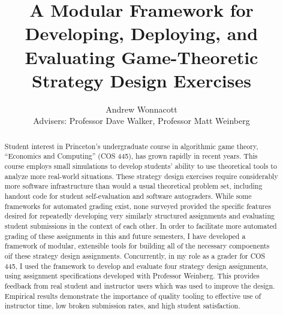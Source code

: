 \documentclass[pageno]{jpaper}
\begin{document}
\title{
A Modular Framework for Developing, Deploying, and Evaluating Game-Theoretic Strategy Design Exercises}

\author{Andrew Wonnacott\\
  Advisers: Professor Dave Walker, Professor Matt Weinberg}

\date{}
\maketitle

\thispagestyle{empty}
\doublespacing{}
\begin{abstract}
  Student interest in Princeton's undergraduate course in algorithmic game theory, ``Economics and Computing'' (COS 445), has grown rapidly in recent years.
  This course employs small simulations to develop students' ability to use theoretical tools to analyze more real-world situations.
  These strategy design exercises require considerably more software infrastructure than would a usual theoretical problem set, including handout code for student self-evaluation and software autograders.
  While some frameworks for automated grading exist, none surveyed provided the specific features desired for repeatedly developing very similarly structured assignments and evaluating student submissions in the context of each other.
  In order to facilitate more automated grading of these assignments in this and future semesters, I have developed a framework of modular, extensible tools for building all of the necessary compoenents oif these strategy design assignments.
  Concurrently, in my role as a grader for COS 445, I used the framework to develop and evaluate four strategy design assignments, using assignment specifications developed with Professor Weinberg.
  This provides feedback from real student and instructor users which was used to improve the design.
  Empirical results demonstrate the importance of quality tooling to effective use of instructor time, low broken submission rates, and high student satisfaction.
\end{abstract}

\newpage
\end{document}
